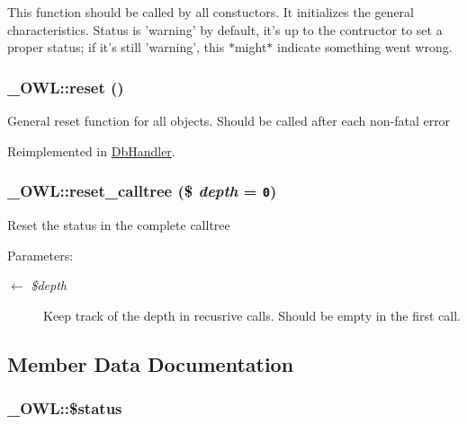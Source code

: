 This function should be called by all constuctors. It initializes the general characteristics. Status is 'warning' by default, it's up to the contructor to set a proper status; if it's still 'warning', this $\ast$might$\ast$ indicate something went wrong. \hypertarget{class__OWL_2f2a042bcf31965194c03033df0edc9b}{
\subsubsection{\setlength{\rightskip}{0pt plus 5cm}\_\-OWL::reset ()}}
\label{class__OWL_2f2a042bcf31965194c03033df0edc9b}


General reset function for all objects. Should be called after each non-fatal error 

Reimplemented in \hyperlink{classDbHandler_9982df4830f05803935bb31bac7fae3d}{DbHandler}.\hypertarget{class__OWL_91389e63fc76f6513147f302cbd92a2e}{
\subsubsection{\setlength{\rightskip}{0pt plus 5cm}\_\-OWL::reset\_\-calltree (\$ {\em depth} = {\tt 0})}}
\label{class__OWL_91389e63fc76f6513147f302cbd92a2e}


Reset the status in the complete calltree

\begin{Desc}
\item[Parameters:]
\begin{description}
\item[\mbox{$\leftarrow$} {\em \$depth}]Keep track of the depth in recusrive calls. Should be empty in the first call. \end{description}
\end{Desc}


\subsection{Member Data Documentation}
\hypertarget{class__OWL_af448f6bc8a90e20c09e9e2b8fe46eb5}{
\subsubsection{\setlength{\rightskip}{0pt plus 5cm}\_\-OWL::\$status}}
\label{class__OWL_af448f6bc8a90e20c09e9e2b8fe46eb5}


